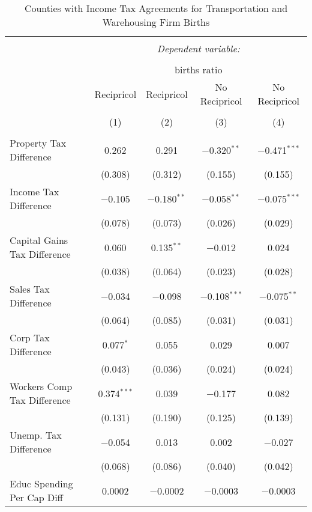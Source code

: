 
\begin{table}[!htbp] \centering 
  \caption{Counties with Income Tax Agreements for  Transportation and Warehousing Firm Births} 
  \label{48-49rd} 
\begin{tabular}{@{\extracolsep{5pt}}lcccc} 
\\[-1.8ex]\hline 
\hline \\[-1.8ex] 
 & \multicolumn{4}{c}{\textit{Dependent variable:}} \\ 
\cline{2-5} 
\\[-1.8ex] & \multicolumn{4}{c}{births ratio} \\ 
 & Recipricol & Recipricol & No Recipricol & No Recipricol \\ 
\\[-1.8ex] & (1) & (2) & (3) & (4)\\ 
\hline \\[-1.8ex] 
 Property Tax Difference & 0.262 & 0.291 & $-$0.320$^{**}$ & $-$0.471$^{***}$ \\ 
  & (0.308) & (0.312) & (0.155) & (0.155) \\ 
  Income Tax Difference & $-$0.105 & $-$0.180$^{**}$ & $-$0.058$^{**}$ & $-$0.075$^{***}$ \\ 
  & (0.078) & (0.073) & (0.026) & (0.029) \\ 
  Capital Gains Tax Difference & 0.060 & 0.135$^{**}$ & $-$0.012 & 0.024 \\ 
  & (0.038) & (0.064) & (0.023) & (0.028) \\ 
  Sales Tax Difference & $-$0.034 & $-$0.098 & $-$0.108$^{***}$ & $-$0.075$^{**}$ \\ 
  & (0.064) & (0.085) & (0.031) & (0.031) \\ 
  Corp Tax Difference & 0.077$^{*}$ & 0.055 & 0.029 & 0.007 \\ 
  & (0.043) & (0.036) & (0.024) & (0.024) \\ 
  Workers Comp Tax Difference & 0.374$^{***}$ & 0.039 & $-$0.177 & 0.082 \\ 
  & (0.131) & (0.190) & (0.125) & (0.139) \\ 
  Unemp. Tax Difference & $-$0.054 & 0.013 & 0.002 & $-$0.027 \\ 
  & (0.068) & (0.086) & (0.040) & (0.042) \\ 
  Educ Spending Per Cap Diff & 0.0002 & $-$0.0002 & $-$0.0003 & $-$0.0003 \\ 

\end{tabular}
\end{table}
